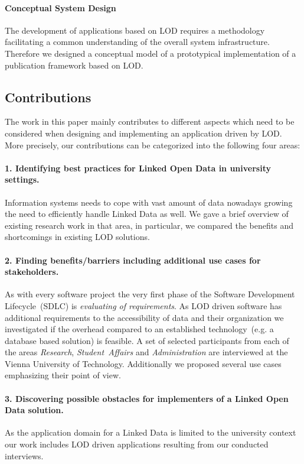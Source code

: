 \documentclass{article}
\begin{document}
\paragraph{Conceptual System Design}
The development of applications based on LOD requires a methodology facilitating a common understanding of the overall system infrastructure. Therefore we designed a conceptual model of a prototypical implementation of a publication framework based on LOD. 

\subsection{Contributions}
The work in this paper mainly contributes to different aspects which need to be considered when designing and implementing an application driven by LOD.
More precisely, our contributions can be categorized into the following four areas:
\paragraph{1. Identifying best practices for Linked Open Data in university settings.}
Information systems needs to cope with vast amount of data nowadays growing the need to efficiently handle Linked Data as well. We gave a brief overview of existing research work in that area, in particular, we compared the benefits and shortcomings in existing LOD solutions. 
\paragraph{2. Finding benefits/barriers including additional use cases for stakeholders.}
As with every software project the very first phase of the Software Development Lifecycle~(SDLC) is \textit{evaluating of requirements}. As LOD driven software has additional requirements to the accessibility of data and their organization we investigated if the overhead compared to an established technology~(e.g. a database based solution) is feasible. A set of selected participants from each of the areas \textit{Research}, \textit{Student~Affairs} and \textit{Administration} are interviewed at the Vienna University of Technology. Additionally we proposed several use cases emphasizing their point of view. 
\paragraph{3. Discovering possible obstacles for implementers of a Linked Open Data solution.}
As the application domain for a Linked Data is limited to the university context our work includes LOD driven applications resulting from our conducted interviews.
\end{document}

